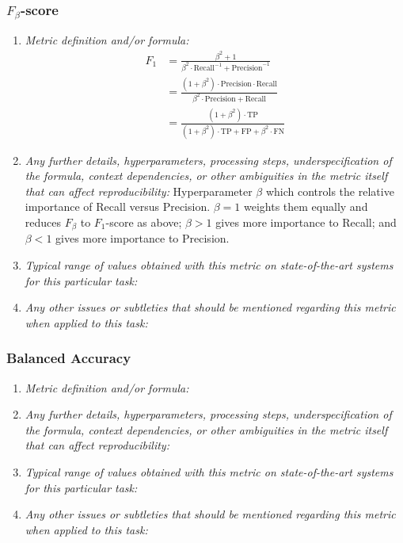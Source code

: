 \documentclass[a4paper,11pt]{article}
\begin{document}
        \subsubsection{$F_\beta$-score}
            \begin{enumerate}[label=\alph*.]
                \item \textit{Metric definition and/or formula:}
                    \begin{align}
                        F_1 &= \frac{\beta^2 + 1}{\beta^2 \cdot \textrm{Recall}^{-1} + \textrm{Precision}^{-1}}\\
                        &= \frac{(1+\beta^2)\cdot\textrm{Precision} \cdot \textrm{Recall}}{\beta^2\cdot\textrm{Precision} + \textrm{Recall}}\\
                        &= \frac{(1+\beta^2)\cdot\textrm{TP}}{(1+\beta^2)\cdot\textrm{TP} + \textrm{FP} + \beta^2\cdot\textrm{FN}}
                    \end{align}
                \bigskip
                \item \textit{Any further details, hyperparameters, processing steps, underspecification of the formula, context dependencies, or other ambiguities in the metric itself that can affect reproducibility:}
                Hyperparameter $\beta$ which controls the relative importance of Recall versus Precision. $\beta=1$ weights them equally and reduces $F_\beta$ to $F_1$-score as above; $\beta>1$ gives more importance to Recall; and $\beta < 1$ gives more importance to Precision. 
                \bigskip
                \item \textit{Typical range of values obtained with this metric on state-of-the-art systems for this particular task:}
                \bigskip
                \item \textit{Any other issues or subtleties that should be mentioned regarding this metric when applied to this task:}
                \bigskip
            \end{enumerate}
        \subsubsection{Balanced Accuracy}
            \begin{enumerate}[label=\alph*.]
                \item \textit{Metric definition and/or formula:}
                \bigskip
                \item \textit{Any further details, hyperparameters, processing steps, underspecification of the formula, context dependencies, or other ambiguities in the metric itself that can affect reproducibility:}
                \bigskip
                \item \textit{Typical range of values obtained with this metric on state-of-the-art systems for this particular task:}
                \bigskip
                \item \textit{Any other issues or subtleties that should be mentioned regarding this metric when applied to this task:}
                \bigskip
            \end{enumerate}
\end{document}
